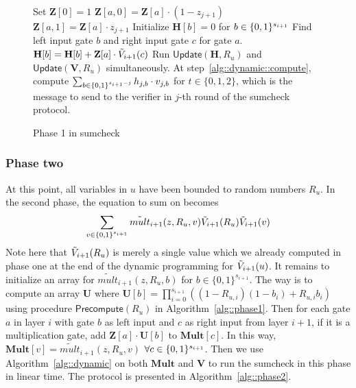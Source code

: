 \begin{figure}[ht!]
	\begin{algorithm}[H]
		\caption{Phase 1 in sumcheck}\label{alg::phase1}
		\begin{algorithmic}[1]
			\State Set $\textbf{Z}[0] = 1$
				\State $\textbf{Z}[a,0] = \textbf{Z}[a]\cdot(1-z_{j+1})$
				\State $\textbf{Z}[a,1] = \textbf{Z}[a]\cdot z_{j+1}$
				\EndFor
			\EndFor
			\EndProcedure
			\State Initialize $\textbf{H}[b] = 0$ for $b\in\{0,1\}^{s_{i+1}}$
			\State Find left input gate $b$ and right input gate $c$ for gate $a$. 
			\State\label{alg::phase1::init} $\textbf{H}[b] = \textbf{H}[b]+ \textbf{Z}[a]\cdot\tilde{V}_{i+1}(c)$
			\EndFor
			\EndProcedure
			\State Run $\mathsf{Update}(\textbf{H},R_u)$ and $\mathsf{Update}(\textbf{V},R_u)$ simultaneously. At step~\ref{alg::dynamic::compute}, compute $\sum_{b\in\{0,1\}^{s_{i+1}-j}}h_{j,b}\cdot v_{j,b}$ for $t\in\{0,1,2\}$, which is the message to send to the verifier in $j$-th round of the sumcheck protocol.
			\EndProcedure
		\end{algorithmic}
	\end{algorithm}
\end{figure}

\subsubsection{Phase two}

At this point, all variables in $u$ have been bounded to random numbers $R_u$. In the second phase, the equation to sum on becomes 
\[
\sum_{v\in\{0,1\}^{s_{i+1}}}\tilde{mult}_{i+1}(z,R_u,v)\tilde{V}_{i+1}(R_u)\tilde{V}_{i+1}(v)
\]
Note here that $\tilde{V}_{i+1}(R_u)$ is merely a single value which we already computed in phase one at the end of the dynamic programming for $\tilde{V}_{i+1}(u)$. It remains to initialize an array for $\tilde{mult}_{i+1}(z,R_u,b)$ for $b\in\{0,1\}^{s_{i+1}}$. The way is to compute an array \textbf{U} where $\textbf{U}[b] = \prod_{i=0}^{s_{i+1}} ((1-R_{u,i})(1-b_i)+R_{u,i}b_i)$ using procedure $\mathsf{Precompute}(R_u)$ in Algorithm~\ref{alg::phase1}. Then for each gate $a$ in layer $i$ with gate $b$ as left input and $c$ as right input from layer $i+1$, if it is a multiplication gate, add $\textbf{Z}[a]\cdot\textbf{U}[b]$ to $\textbf{Mult}[c]$. In this way, $\textbf{Mult}[v]=\tilde{mult}_{i+1}(z,R_u,v)$ $\forall c\in\{0,1\}^{s_{i+1}}$. Then we use Algorithm~\ref{alg::dynamic} on both $\textbf{Mult}$ and $\textbf{V}$ to run the sumcheck in this phase in linear time. The protocol is presented in Algorithm~\ref{alg::phase2}.


